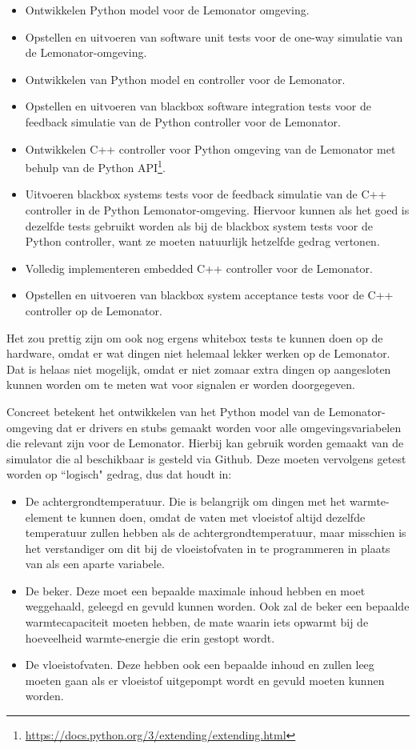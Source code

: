 \documentclass{article}
\begin{document}
	\begin{itemize}
		\item Ontwikkelen Python model voor de Lemonator omgeving.
		\item Opstellen en uitvoeren van software unit tests voor de one-way simulatie van de Lemonator-omgeving.
		\item Ontwikkelen van Python model en controller voor de Lemonator.
		\item Opstellen en uitvoeren van blackbox software integration tests voor de feedback simulatie van de Python controller voor de Lemonator.
		\item Ontwikkelen C++ controller voor Python omgeving van de Lemonator met behulp van de Python API\footnote{\url{https://docs.python.org/3/extending/extending.html}}.
		\item Uitvoeren blackbox systems tests voor de feedback simulatie van de C++ controller in de Python Lemonator-omgeving. Hiervoor kunnen als het goed is dezelfde tests gebruikt worden als bij de blackbox system tests voor de Python controller, want ze moeten natuurlijk hetzelfde gedrag vertonen.
		\item Volledig implementeren embedded C++ controller voor de Lemonator.
		\item Opstellen en uitvoeren van blackbox system acceptance tests voor de C++ controller op de Lemonator.
	\end{itemize}
	
	Het zou prettig zijn om ook nog ergens whitebox tests te kunnen doen op de hardware, omdat er wat dingen niet helemaal lekker werken op de Lemonator. Dat is helaas niet mogelijk, omdat er niet zomaar extra dingen op aangesloten kunnen worden om te meten wat voor signalen er worden doorgegeven.
	
	Concreet betekent het ontwikkelen van het Python model van de Lemonator-omgeving dat er drivers en stubs gemaakt worden voor alle omgevingsvariabelen die relevant zijn voor de Lemonator. Hierbij kan gebruik worden gemaakt van de simulator die al beschikbaar is gesteld via Github. Deze moeten vervolgens getest worden op ``logisch" gedrag, dus dat houdt in:
	
	\begin{itemize}
		\item De achtergrondtemperatuur. Die is belangrijk om dingen met het warmte-element te kunnen doen, omdat de vaten met vloeistof altijd dezelfde temperatuur zullen hebben als de achtergrondtemperatuur, maar misschien is het verstandiger om dit bij de vloeistofvaten in te programmeren in plaats van als een aparte variabele.
		\item De beker. Deze moet een bepaalde maximale inhoud hebben en moet weggehaald, geleegd en gevuld kunnen worden. Ook zal de beker een bepaalde warmtecapaciteit moeten hebben, de mate waarin iets opwarmt bij de hoeveelheid warmte-energie die erin gestopt wordt.
		\item De vloeistofvaten. Deze hebben ook een bepaalde inhoud en zullen leeg moeten gaan als er vloeistof uitgepompt wordt en gevuld moeten kunnen worden.
	\end{itemize}
	
\end{document}
